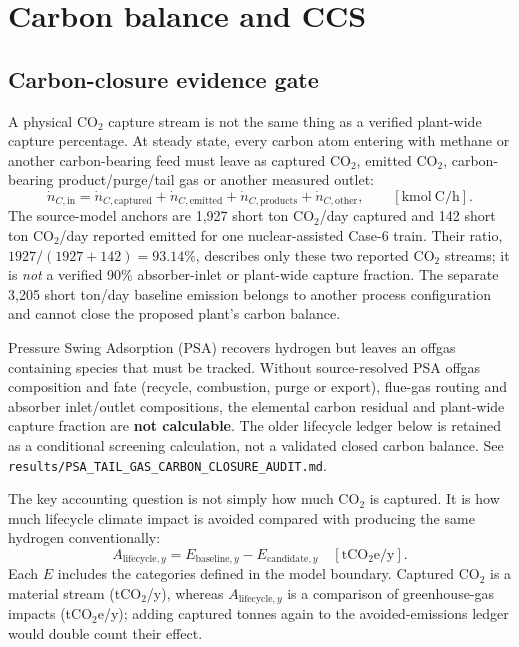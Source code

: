 \section{Carbon balance and CCS}\label{sec:carbon}
\subsection{Carbon-closure evidence gate}
A physical CO$_2$ capture stream is not the same thing as a verified plant-wide capture percentage. At steady state, every carbon atom entering with methane or another carbon-bearing feed must leave as captured CO$_2$, emitted CO$_2$, carbon-bearing product/purge/tail gas or another measured outlet:
\[
\dot n_{C,\mathrm{in}}=\dot n_{C,\mathrm{captured}}+
\dot n_{C,\mathrm{emitted}}+\dot n_{C,\mathrm{products}}+
\dot n_{C,\mathrm{other}},\qquad
[\mathrm{kmol\ C/h}].
\]
The source-model anchors are 1,927 short ton CO$_2$/day captured and 142 short ton CO$_2$/day reported emitted for one nuclear-assisted Case-6 train. Their ratio, $1927/(1927+142)=93.14\%$, describes only these two reported CO$_2$ streams; it is \emph{not} a verified 90\% absorber-inlet or plant-wide capture fraction. The separate 3,205 short ton/day baseline emission belongs to another process configuration and cannot close the proposed plant's carbon balance.

Pressure Swing Adsorption (PSA) recovers hydrogen but leaves an offgas containing species that must be tracked. Without source-resolved PSA offgas composition and fate (recycle, combustion, purge or export), flue-gas routing and absorber inlet/outlet compositions, the elemental carbon residual and plant-wide capture fraction are \textbf{not calculable}. The older lifecycle ledger below is retained as a conditional screening calculation, not a validated closed carbon balance. See \texttt{results/PSA\_TAIL\_GAS\_CARBON\_CLOSURE\_AUDIT.md}.

The key accounting question is not simply how much CO$_2$ is captured. It is how much lifecycle climate impact is avoided compared with producing the same hydrogen conventionally:
\[
A_{\mathrm{lifecycle},y}
=E_{\mathrm{baseline},y}-E_{\mathrm{candidate},y}
\quad[\mathrm{tCO_2e/y}].
\]
Each $E$ includes the categories defined in the model boundary. Captured CO$_2$ is a material stream (tCO$_2$/y), whereas $A_{\mathrm{lifecycle},y}$ is a comparison of greenhouse-gas impacts (tCO$_2$e/y); adding captured tonnes again to the avoided-emissions ledger would double count their effect.

